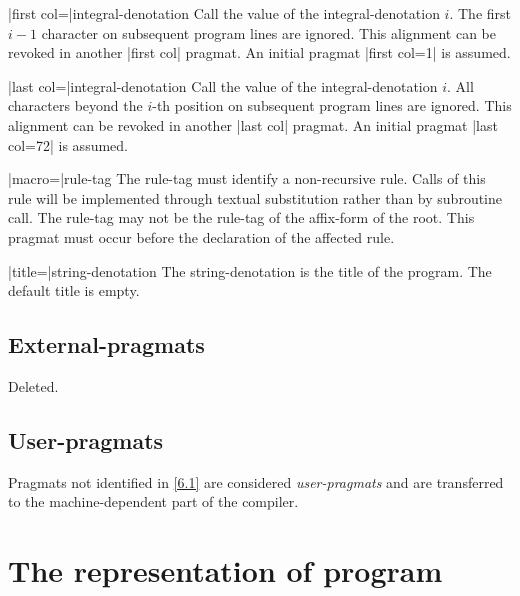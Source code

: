\documentclass{article}
\newcommand\g[1]{{\sf #1}}
\begin{document}
\X\pp|first col=|\g{integral-denotation}\Y
Call the value of the \g{integral-denotation} $i$. The first $i-1$
character on subsequent program lines are ignored. This alignment can be
revoked in another \pp|first col| pragmat. An initial pragmat \pp|first
col=1| is assumed.

\X\pp|last col=|\g{integral-denotation}\Y
Call the value of the \g{integral-denotation} $i$. All characters beyond the
$i$-th position on subsequent program lines are ignored. This alignment can
be revoked in another \pp|last col| pragmat. An initial pragmat \pp|last
col=72| is assumed.

\X\pp|macro=|\g{rule-tag}\Y
The \g{rule-tag} must identify a non-recursive rule. Calls of this rule will be
implemented through textual substitution rather than by subroutine call.
The \g{rule-tag} may not be the \g{rule-tag} of the \g{affix-form} of the
\g{root}. This pragmat must occur before the declaration of the affected
rule.

\X\pp|title=|\g{string-denotation}\Y
The \g{string-denotation} is the title of the program. The default title is
empty.

\subsection{External-pragmats}\label{6.2}

Deleted.

\subsection{User-pragmats}\label{6.3}

Pragmats not identified in \ref{6.1} are considered
\emph{user-pragmats} and are transferred to the machine-dependent part of the
compiler.

\section{The representation of program}\label{sec:7}
\end{document}
